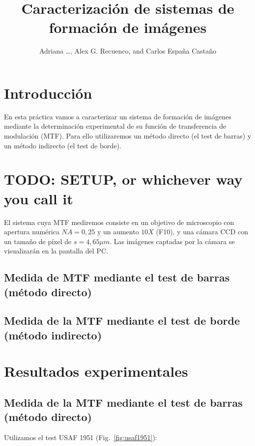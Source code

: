 \documentclass{../packages/optica-article}
\begin{document}
\title{Caracterización de sistemas de formación de imágenes}

\author{Adriana \ldots, Alex G. Recuenco, and Carlos España Castaño}

\address{Universidad Complutense de Madrid, Madrid, DC 28040, España}

\section{Introducción}
En esta práctica vamos a caracterizar un sistema de formación de imágenes mediante la determinación experimental de su función de transferencia de modulación (MTF). Para ello utilizaremos un método directo (el test de barras) y un método indirecto (el test de borde).


\section{TODO: SETUP, or whichever way you call it}


El sistema cuya MTF mediremos consiste en un objetivo de microscopio con apertura numérica $NA = 0,25$ y un aumento $10X$ (F10), y una cámara CCD con un tamaño de píxel de $s=4,65 \mu m$. Las imágenes captadas por la cámara se visualizarán en la pantalla del PC.

\subsection{Medida de MTF mediante el test de barras (método directo)}
\subsection{Medida de la MTF mediante el test de borde (método indirecto)}
\section{Resultados experimentales}

\subsection{Medida de la MTF mediante el test de barras (método directo)}

Utilizamos el test USAF 1951 (Fig.~\ref{fig:usaf1951}):
\end{document}
